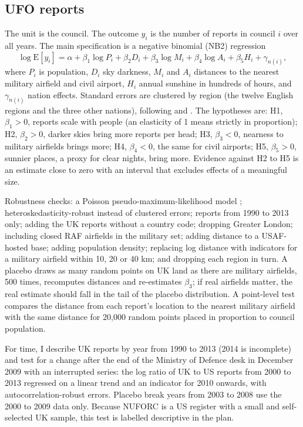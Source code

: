 \documentclass[11pt,a4paper]{article}
\begin{document}
\subsection{UFO reports}
The unit is the council. The outcome $y_i$ is the number of reports in council $i$ over all years. The main specification is a negative binomial (NB2) regression
\begin{equation}
\log \mathrm{E}[y_i] = \alpha + \beta_1 \log P_i + \beta_2 D_i + \beta_3 \log M_i + \beta_4 \log A_i + \beta_5 H_i + \gamma_{n(i)},
\end{equation}
where $P_i$ is population, $D_i$ sky darkness, $M_i$ and $A_i$ distances to the nearest military airfield and civil airport, $H_i$ annual sunshine in hundreds of hours, and $\gamma_{n(i)}$ nation effects. Standard errors are clustered by region (the twelve English regions and the three other nations), following \citet{cameron2015} and \citet{abadie2023}. The hypotheses are: H1, $\beta_1 > 0$, reports scale with people (an elasticity of 1 means strictly in proportion); H2, $\beta_2 > 0$, darker skies bring more reports per head; H3, $\beta_3 < 0$, nearness to military airfields brings more; H4, $\beta_4 < 0$, the same for civil airports; H5, $\beta_5 > 0$, sunnier places, a proxy for clear nights, bring more. Evidence against H2 to H5 is an estimate close to zero with an interval that excludes effects of a meaningful size.

Robustness checks: a Poisson pseudo-maximum-likelihood model \citep{santos2006}; heteroskedasticity-robust instead of clustered errors; reports from 1990 to 2013 only; adding the UK reports without a country code; dropping Greater London; including closed RAF airfields in the military set; adding distance to a USAF-hosted base; adding population density; replacing log distance with indicators for a military airfield within 10, 20 or 40 km; and dropping each region in turn. A placebo draws as many random points on UK land as there are military airfields, 500 times, recomputes distances and re-estimates $\beta_3$; if real airfields matter, the real estimate should fall in the tail of the placebo distribution. A point-level test compares the distance from each report's location to the nearest military airfield with the same distance for 20,000 random points placed in proportion to council population.

For time, I describe UK reports by year from 1990 to 2013 (2014 is incomplete) and test for a change after the end of the Ministry of Defence desk in December 2009 with an interrupted series: the log ratio of UK to US reports from 2000 to 2013 regressed on a linear trend and an indicator for 2010 onwards, with autocorrelation-robust errors. Placebo break years from 2003 to 2008 use the 2000 to 2009 data only. Because NUFORC is a US register with a small and self-selected UK sample, this test is labelled descriptive in the plan.
\end{document}
